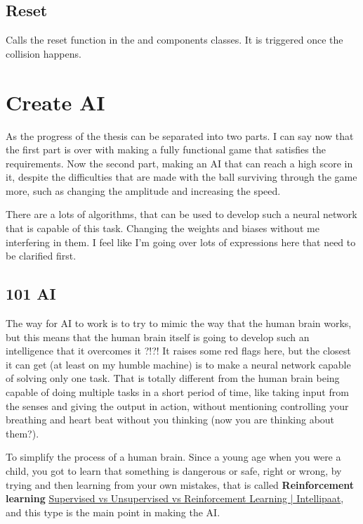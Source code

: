 \subsection{Reset}
Calls the reset function in the  and  components classes. It is triggered once the collision happens.

\section{Create AI}\label{create-ai}

As the progress of the thesis can be separated into two parts. I can say now that the first part is over with making a fully functional game that satisfies the requirements. Now the second part, making an AI that can reach a high score in it, despite the difficulties that are made with the ball surviving through the game more, such as changing the amplitude and increasing the speed.

There are a lots of algorithms, that can be used to develop such a neural network that is capable of this task. Changing the weights and biases without me interfering in them. I feel like I'm going over lots of expressions here that need to be clarified first.

\subsection{101 AI}\label{sec:101-ai}
The way for AI to work is to try to mimic the way that the human brain works, but this means that the human brain itself is going to develop such an intelligence that it overcomes it ?!?! It raises some red flags here, but the closest it can get (at least on my humble machine) is to make a neural network capable of solving only one task. That is totally different from the human brain being capable of doing multiple tasks in a short period of time, like taking input from the senses and giving the output in action, without mentioning controlling your breathing and heart beat without you thinking (now you are thinking about them?).

To simplify the process of a human brain. Since a young age when you were a child, you got to learn that something is dangerous or safe, right or wrong, by trying and then learning from your own mistakes, that is called \textbf{Reinforcement learning} \href{https://intellipaat.com/blog/supervised-learning-vs-unsupervised-learning-vs-reinforcement-learning/}{Supervised vs Unsupervised vs Reinforcement Learning | Intellipaat}, and this type is the main point in making the AI.


